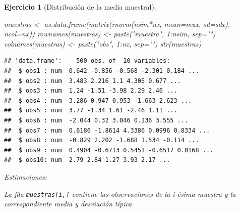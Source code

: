 \documentclass[
]{book}
\newenvironment{Shaded}{\begin{snugshade}}{\end{snugshade}}
\newcommand{\AttributeTok}[1]{\textcolor[rgb]{0.77,0.63,0.00}{#1}}
\newcommand{\DecValTok}[1]{\textcolor[rgb]{0.00,0.00,0.81}{#1}}
\newcommand{\FunctionTok}[1]{\textcolor[rgb]{0.00,0.00,0.00}{#1}}
\newcommand{\NormalTok}[1]{#1}
\newcommand{\OtherTok}[1]{\textcolor[rgb]{0.56,0.35,0.01}{#1}}
\newcommand{\SpecialCharTok}[1]{\textcolor[rgb]{0.00,0.00,0.00}{#1}}
\newcommand{\StringTok}[1]{\textcolor[rgb]{0.31,0.60,0.02}{#1}}
\theoremstyle{break}
\newtheorem{exercise}{Ejercicio}[chapter]
\theoremstyle{nonumberplain}
\begin{document}
\begin{exercise}[Distribución de la media muestral]
\begin{enumerate}
\begin{Shaded}
\begin{Highlighting}[]
\NormalTok{muestras }\OtherTok{\textless{}{-}} \FunctionTok{as.data.frame}\NormalTok{(}\FunctionTok{matrix}\NormalTok{(}\FunctionTok{rnorm}\NormalTok{(nsim}\SpecialCharTok{*}\NormalTok{nx, }\AttributeTok{mean=}\NormalTok{mux, }\AttributeTok{sd=}\NormalTok{sdx), }\AttributeTok{ncol=}\NormalTok{nx))}
\FunctionTok{rownames}\NormalTok{(muestras) }\OtherTok{\textless{}{-}} \FunctionTok{paste}\NormalTok{(}\StringTok{"muestra"}\NormalTok{, }\DecValTok{1}\SpecialCharTok{:}\NormalTok{nsim, }\AttributeTok{sep=}\StringTok{""}\NormalTok{)}
\FunctionTok{colnames}\NormalTok{(muestras) }\OtherTok{\textless{}{-}} \FunctionTok{paste}\NormalTok{(}\StringTok{"obs"}\NormalTok{, }\DecValTok{1}\SpecialCharTok{:}\NormalTok{nx, }\AttributeTok{sep=}\StringTok{""}\NormalTok{)}
\FunctionTok{str}\NormalTok{(muestras)}
\end{Highlighting}
\end{Shaded}

\begin{verbatim}
## 'data.frame':    500 obs. of  10 variables:
##  $ obs1 : num  0.642 -0.856 -0.568 -2.301 0.184 ...
##  $ obs2 : num  3.483 2.216 1.1 4.305 0.677 ...
##  $ obs3 : num  1.24 -1.51 -3.98 2.29 2.46 ...
##  $ obs4 : num  3.286 0.947 0.953 -1.663 2.623 ...
##  $ obs5 : num  3.77 -1.34 1.61 -2.46 1.11 ...
##  $ obs6 : num  -2.044 0.32 3.046 0.136 3.555 ...
##  $ obs7 : num  0.6186 -1.8614 4.3386 0.0996 0.8334 ...
##  $ obs8 : num  -0.829 2.202 -1.688 1.534 -0.114 ...
##  $ obs9 : num  0.4904 -0.6713 0.5451 -0.6517 0.0168 ...
##  $ obs10: num  2.79 2.84 1.27 3.93 2.17 ...
\end{verbatim}

  Estimaciones:

\begin{Shaded}
\end{Shaded}

  La fila \texttt{muestras{[}i,{]}} contiene las observaciones de la i-ésima muestra y
  la correspondiente media y desviación típica.


\end{enumerate}
\end{exercise}
\end{document}
